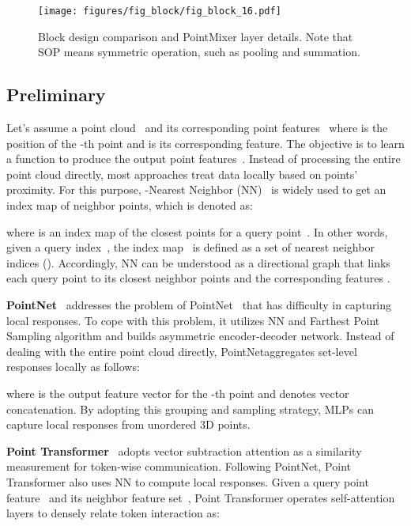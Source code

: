  \begin{figure}[!t]
\centering
\texttt{[image: figures/fig\_block/fig\_block\_16.pdf]}
\vspace{-2mm}
\caption{Block design comparison and PointMixer layer details. Note that SOP means symmetric operation, such as pooling and summation. 
}
\label{fig:fig_block}
\vspace{-4mm}
\end{figure} 
\subsection{Preliminary}
\label{subsec:preliminary}
Let's assume a point cloud~ and its corresponding point features~ where  is the position of the -th point and  is its corresponding feature. The objective is to learn a function  to produce the output point features~. Instead of processing the entire point cloud directly, most approaches treat data locally based on points' proximity. For this purpose, -Nearest Neighbor (NN)~\cite{flann,faiss,open3d} is widely used to get an index map of neighbor points, which is denoted as:

where  is an index map of the  closest points for a query point~.
In other words, given a query index~, the index map~ is defined as a set of  nearest neighbor indices (). Accordingly, NN can be understood as a directional graph that links each query point  to its  closest neighbor points  and the corresponding features .






\noindent \textbf{PointNet\plusplus}~\cite{pointnet++} addresses the problem of PointNet~\cite{pointnet} that has difficulty in capturing local responses. 
To cope with this problem, it utilizes NN and Farthest Point Sampling algorithm and builds asymmetric encoder-decoder network. Instead of dealing with the entire point cloud directly, PointNet\plusplus aggregates set-level responses locally as follows:
\vspace{-2mm}

where  is the output feature vector for the -th point and  denotes vector concatenation.
By adopting this grouping and sampling strategy, MLPs can capture local responses from unordered 3D points.


\noindent \textbf{Point Transformer}~\cite{point-transformer} adopts vector subtraction attention as a similarity measurement for token-wise communication. Following PointNet\plusplus, Point Transformer also uses NN to compute local responses. Given a query point feature~ and its neighbor feature set~, Point Transformer operates self-attention layers to densely relate token interaction as:
\vspace{-2mm}

